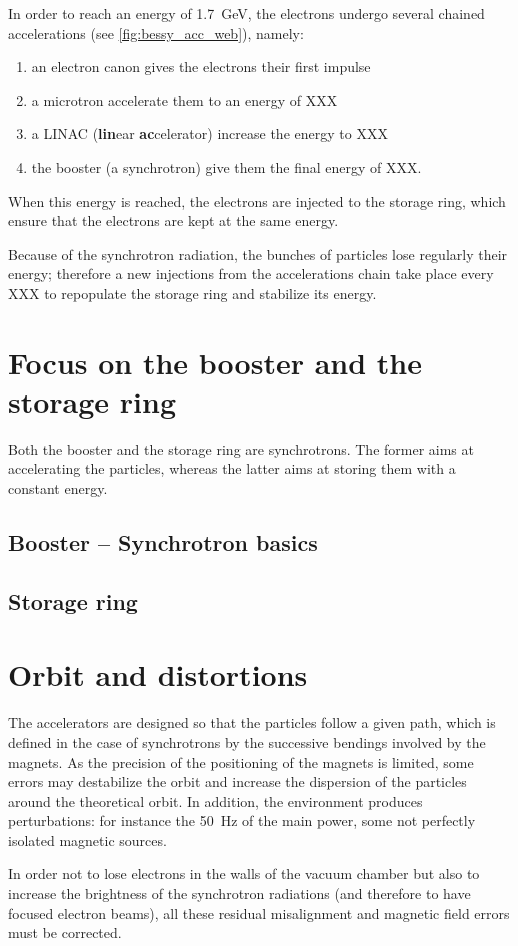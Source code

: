 In order to reach an energy of 1.7~GeV, the electrons undergo several chained accelerations (see \autoref{fig:bessy_acc_web}), namely:
\begin{enumerate}
    \item an electron canon gives the electrons their first impulse
    \item a microtron accelerate them to an energy of XXX
    \item a LINAC (\textbf{lin}ear \textbf{ac}celerator) increase the energy to XXX
    \item the booster (a synchrotron) give them the final energy of XXX.
\end{enumerate}

When this energy is reached, the electrons are injected to the storage ring, which ensure that the electrons are kept at the same energy.

Because of the synchrotron radiation, the bunches of particles lose regularly their energy; therefore a new injections from the accelerations chain take place every XXX to repopulate the storage ring and stabilize its energy.

\section{Focus on the booster and the storage ring}
Both the booster and the storage ring are synchrotrons. The former aims at accelerating the particles, whereas the latter aims at storing them with a constant energy.

\subsection{Booster -- Synchrotron basics}

\subsection{Storage ring}

\section{Orbit and distortions}

The accelerators are designed so that the particles follow a given path, which is defined in the case of synchrotrons by the successive bendings involved by the magnets. As the precision of the positioning of the magnets is limited, some errors may destabilize the orbit and increase the dispersion of the particles around the theoretical orbit. In addition, the environment produces perturbations: for instance the 50~Hz of the main power, some not perfectly isolated magnetic sources.

In order not to lose electrons in the walls of the vacuum chamber but also to increase the brightness of the synchrotron radiations (and therefore to have focused electron beams), all these residual misalignment and magnetic field errors must be corrected.


